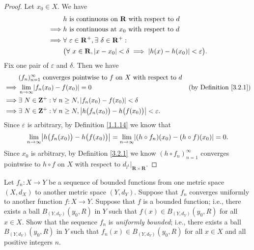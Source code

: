 \begin{proof}
    Let \(x_0 \in X\).
    We have
    \begin{align*}
                 & h \text{ is continuous on } \mathbf{R} \text{ with respect to } d                                         \\
        \implies & h \text{ is continuous at } x_0 \text{ with respect to } d                                                \\
        \implies & \forall\ \varepsilon \in \mathbf{R}^+, \exists\ \delta \in \mathbf{R}^+ :                                 \\
                 & \big(\forall\ x \in \mathbf{R}, \abs*{x - x_0} < \delta \implies \abs*{h(x) - h(x_0)} < \varepsilon\big).
    \end{align*}
    Fix one pair of \(\varepsilon\) and \(\delta\).
    Then we have
    \begin{align*}
                 & (f_n)_{n = 1}^\infty \text{ converges pointwise to } f \text{ on } X \text{ with respect to } d                                                     \\
        \implies & \lim_{n \to \infty} \abs*{f_n(x_0) - f(x_0)} = 0                                                               & \text{(by Definition \ref{3.2.1})} \\
        \implies & \exists\ N \in \mathbf{Z}^+ : \forall\ n \geq N, \abs*{f_n(x_0) - f(x_0)} < \delta                                                                  \\
        \implies & \exists\ N \in \mathbf{Z}^+ : \forall\ n \geq N, \abs*{h\big(f_n(x_0)\big) - h\big(f(x_0)\big)} < \varepsilon.
    \end{align*}
    Since \(\varepsilon\) is arbitrary, by Definition \ref{1.1.14} we know that
    \[
        \lim_{n \to \infty} \abs*{h\big(f_n(x_0)\big) - h\big(f(x_0)\big)} = \lim_{n \to \infty} \abs*{(h \circ f_n)(x_0) - (h \circ f)(x_0)} = 0.
    \]
    Since \(x_0\) is arbitrary, by Definition \ref{3.2.1} we know \((h \circ f_n)_{n = 1}^\infty\) converges pointwise to \(h \circ f\) on \(X\) with respect to \(d_{l^1}|_{\mathbf{R} \times \mathbf{R}}\).
\end{proof}

\begin{exercise}\label{ex 3.2.4}
    Let \(f_n : X \to Y\) be a sequence of bounded functions from one metric space \((X, d_X)\) to another metric space \((Y, d_Y)\).
    Suppose that \(f_n\) converges uniformly to another function \(f : X \to Y\).
    Suppose that \(f\) is a bounded function;
    i.e., there exists a ball \(B_{(Y, d_Y)}(y_0, R)\) in \(Y\) such that \(f(x) \in B_{(Y, d_Y)}(y_0, R)\) for all \(x \in X\).
    Show that the sequence \(f_n\) is \emph{uniformly bounded};
    i.e., there exists a ball \(B_{(Y, d_Y)}(y_0, R)\) in \(Y\) such that \(f_n(x) \in B_{(Y, d_Y)}(y_0, R)\) for all \(x \in X\) and all positive integers \(n\).
\end{exercise}

